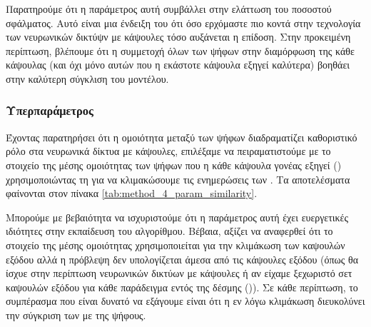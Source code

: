 Παρατηρούμε ότι η παράμετρος αυτή συμβάλλει στην ελάττωση του ποσοστού σφάλματος. Αυτό είναι μια ένδειξη του ότι όσο ερχόμαστε πιο κοντά στην τεχνολογία των νευρωνικών δικτύψν με κάψουλες τόσο αυξάνεται η επίδοση. Στην προκειμένη περίπτωση, βλέπουμε ότι η συμμετοχή όλων των ψήφων στην διαμόρφωση της κάθε κάψουλας (και όχι μόνο αυτών που η εκάστοτε κάψουλα εξηγεί καλύτερα) βοηθάει στην καλύτερη σύγκλιση του μοντέλου.

\subsubsection{Υπερπαράμετρος }
Έχοντας παρατηρήσει ότι η ομοιότητα μεταξύ των ψήφων διαδραματίζει καθοριστικό ρόλο στα νευρωνικά δίκτυα με κάψουλες, επιλέξαμε να πειραματιστούμε με το στοιχείο της μέσης ομοιότητας των ψήφων που η κάθε κάψουλα γονέας εξηγεί () χρησιμοποιώντας τη για να κλιμακώσουμε τις ενημερώσεις των . Τα αποτελέσματα φαίνονται στον πίνακα \ref{tab:method_4_param_similarity}.\par


\begin{table}[h]
    \begin{center}
    \end{center}
    \caption[]{\label{tab:method_4_param_similarity}Επίδραση της παραμέτρου  της μεθόδου 4 στην επίδοση (όπως μετράται από το ποσοστό σφάλματος) στο σύνολο δεδομένων ελέγχου . Τα πειράματα αυτά πραγματοποιήθηκαν για 10 εποχές με μέγεθος δέσμης ίσο με 8.} 
\end{table}

Μπορούμε με βεβαιότητα να ισχυριστούμε ότι η παράμετρος αυτή έχει ευεργετικές ιδιότητες στην εκπαίδευση του αλγορίθμου. Βέβαια, αξίζει να αναφερθεί ότι το στοιχείο της μέσης ομοιότητας χρησιμοποιείται για την κλιμάκωση των καψουλών εξόδου αλλά η πρόβλεψη δεν υπολογίζεται άμεσα από τις κάψουλες εξόδου (όπως θα ίσχυε στην περίπτωση νευρωνικών δικτύων με κάψουλες ή αν είχαμε ξεχωριστό σετ καψουλών εξόδου για κάθε παράδειγμα εντός της δέσμης ()). Σε κάθε περίπτωση, το συμπέρασμα που είναι δυνατό να εξάγουμε είναι ότι η εν λόγω κλιμάκωση διευκολύνει την σύγκριση των  με της ψήφους.

